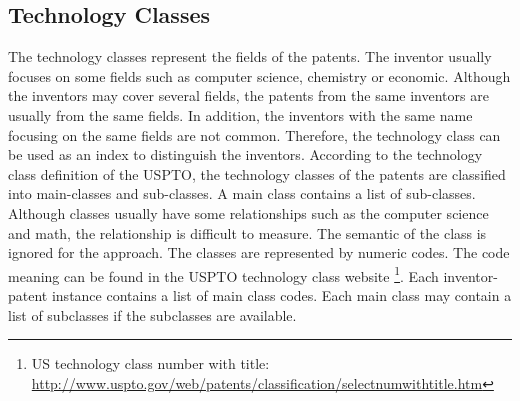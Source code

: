 \subsection{Technology Classes}
The technology classes represent the fields of the patents. The inventor usually focuses on some fields such as computer science, chemistry or economic. Although the inventors may cover several fields, the patents from the same inventors are usually from the same fields. In addition, the inventors with the same name focusing on the same fields are not common. Therefore, the technology class can be used as an index to distinguish the inventors. According to the technology class definition of the USPTO, the technology classes of the patents are classified into main-classes and sub-classes. A main class contains a list of sub-classes. Although classes usually have some relationships such as the computer science and math, the relationship is difficult to measure. The semantic of the class is ignored for the approach. The classes are represented by numeric codes. The code meaning can be found in the USPTO technology class website \footnote{US technology class number with title: \url{http://www.uspto.gov/web/patents/classification/selectnumwithtitle.htm}}.
Each inventor-patent instance contains a list of main class codes. Each main class may contain a list of subclasses if the subclasses are available.


